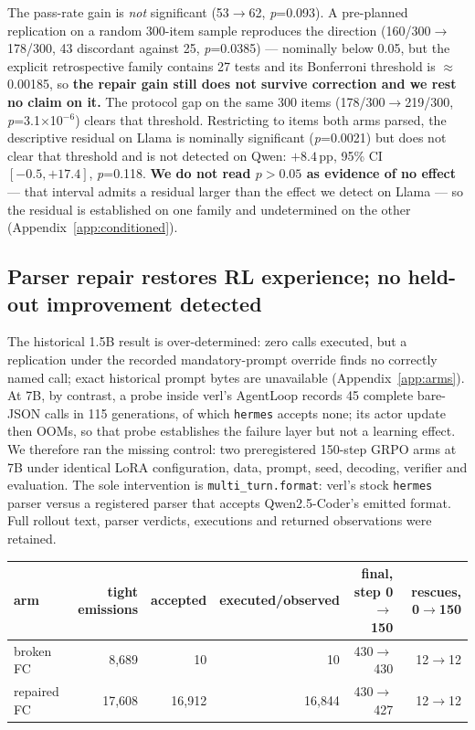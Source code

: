 The pass-rate gain is \emph{not} significant (53$\to$62, \emph{p}=0.093). A pre-planned replication
on a random 300-item sample reproduces the direction (160/300$\to$178/300, 43 discordant against
25, \emph{p}=0.0385) --- nominally below 0.05, but the explicit retrospective family contains 27 tests
and its Bonferroni threshold is $\approx$0.00185, so \textbf{the repair gain still does not survive
correction and we rest no claim on it.} The protocol gap on the same 300 items
(178/300$\to$219/300, \emph{p}=3.1$\times$10$^{-6}$) clears that threshold.
Restricting to items both arms parsed, the descriptive residual on Llama is nominally significant (\emph{p}=0.0021) but does not clear that threshold
and is not detected on Qwen: $+8.4$\,pp, 95\% CI $[-0.5,+17.4]$, \emph{p}=0.118. \textbf{We do not
read $p>0.05$ as evidence of no effect} --- that interval admits a residual larger than the effect
we detect on Llama --- so the residual is established on one family and undetermined on the other
(Appendix~\ref{app:conditioned}).

\subsection{Parser repair restores RL experience; no held-out improvement detected}
\label{sec:rl}
\label{sec:norepair}
\label{sec:sufficiency}

The historical 1.5B result is over-determined: zero calls executed, but a replication under the
recorded mandatory-prompt override finds no correctly named call; exact historical prompt bytes
are unavailable (Appendix~\ref{app:arms}). At 7B, by contrast, a
probe inside verl's AgentLoop records 45 complete bare-JSON calls in 115 generations, of which
\texttt{hermes} accepts none; its actor update then OOMs, so that
probe establishes the failure layer but not a learning effect. We therefore ran the missing
control: two preregistered 150-step GRPO arms at 7B under identical LoRA configuration, data,
prompt, seed, decoding, verifier and evaluation. The sole intervention is
\texttt{multi\_turn.format}: verl's stock \texttt{hermes} parser versus a registered parser that
accepts Qwen2.5-Coder's emitted format. Full rollout text, parser verdicts, executions and returned
observations were retained.

\begin{center}
\small
{}\label{tab:p3formal}
\begin{tabular}{@{}lrrrrr@{}}
\toprule
arm & tight emissions & accepted & executed/observed & final, step 0$\to$150 & rescues, 0$\to$150 \\
\midrule
broken FC & 8{,}689 & 10 & 10 & 430$\to$430 & 12$\to$12 \\
repaired FC & 17{,}608 & 16{,}912 & 16{,}844 & 430$\to$427 & 12$\to$12 \\
\bottomrule
\end{tabular}
\end{center}

